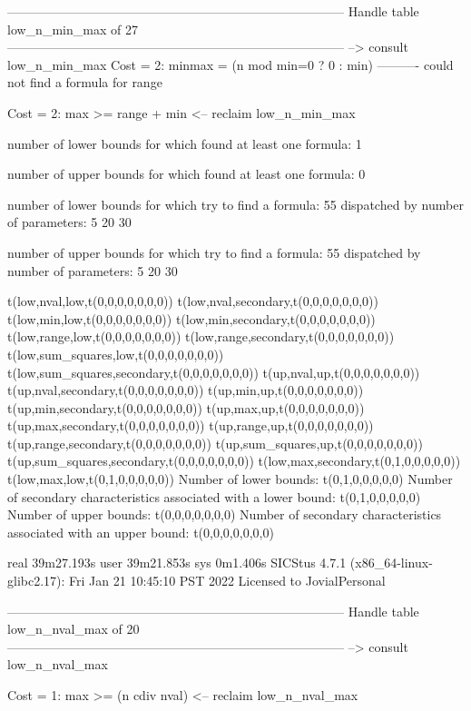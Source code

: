 --------------------------------------------------------------------------------
Handle table low_n_min_max of 27
--------------------------------------------------------------------------------
--> consult low_n_min_max
Cost =  2:  minmax = (n mod min=0 ? 0 : min)
----------
could not find a formula for range

Cost =  2:  max >= range + min
<-- reclaim low_n_min_max

number of lower bounds for which found at least one formula: 1

number of upper bounds for which found at least one formula: 0

number of lower bounds for which try to find a formula: 55
dispatched by number of parameters: 5  20  30

number of upper bounds for which try to find a formula: 55
dispatched by number of parameters: 5  20  30

t(low,nval,low,t(0,0,0,0,0,0,0))
t(low,nval,secondary,t(0,0,0,0,0,0,0))
t(low,min,low,t(0,0,0,0,0,0,0))
t(low,min,secondary,t(0,0,0,0,0,0,0))
t(low,range,low,t(0,0,0,0,0,0,0))
t(low,range,secondary,t(0,0,0,0,0,0,0))
t(low,sum_squares,low,t(0,0,0,0,0,0,0))
t(low,sum_squares,secondary,t(0,0,0,0,0,0,0))
t(up,nval,up,t(0,0,0,0,0,0,0))
t(up,nval,secondary,t(0,0,0,0,0,0,0))
t(up,min,up,t(0,0,0,0,0,0,0))
t(up,min,secondary,t(0,0,0,0,0,0,0))
t(up,max,up,t(0,0,0,0,0,0,0))
t(up,max,secondary,t(0,0,0,0,0,0,0))
t(up,range,up,t(0,0,0,0,0,0,0))
t(up,range,secondary,t(0,0,0,0,0,0,0))
t(up,sum_squares,up,t(0,0,0,0,0,0,0))
t(up,sum_squares,secondary,t(0,0,0,0,0,0,0))
t(low,max,secondary,t(0,1,0,0,0,0,0))
t(low,max,low,t(0,1,0,0,0,0,0))
Number of lower bounds:                                             t(0,1,0,0,0,0,0)
Number of secondary characteristics associated with a lower bound:  t(0,1,0,0,0,0,0)
Number of upper bounds:                                             t(0,0,0,0,0,0,0)
Number of secondary characteristics associated with an upper bound: t(0,0,0,0,0,0,0)

real	39m27.193s
user	39m21.853s
sys	0m1.406s
SICStus 4.7.1 (x86_64-linux-glibc2.17): Fri Jan 21 10:45:10 PST 2022
Licensed to JovialPersonal


--------------------------------------------------------------------------------
Handle table low_n_nval_max of 20
--------------------------------------------------------------------------------
--> consult low_n_nval_max

Cost =  1:  max >= (n cdiv nval)
<-- reclaim low_n_nval_max

